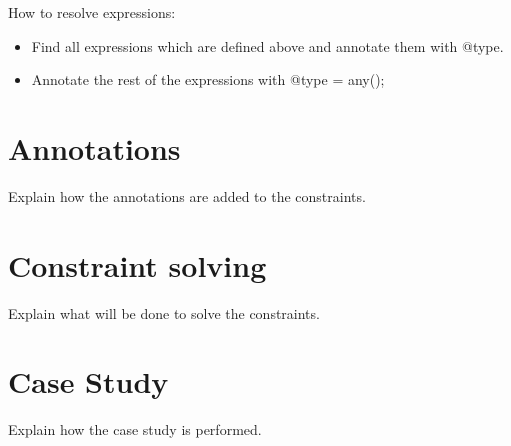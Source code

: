 \documentclass[../main.tex]{subfiles}
\begin{document}
    How to resolve expressions:
    \begin{itemize}
        \item Find all expressions which are defined above and annotate them with @type.
        \item Annotate the rest of the expressions with @type = any();
    \end{itemize}

       
    
    \section{Annotations}
    Explain how the annotations are added to the constraints.
    \Blindtext
    
    \section{Constraint solving}
    Explain what will be done to solve the constraints.
    \\
    \Blindtext
    
    \section{Case Study}
    Explain how the case study is performed.
    \\
    \Blindtext
\end{document}

